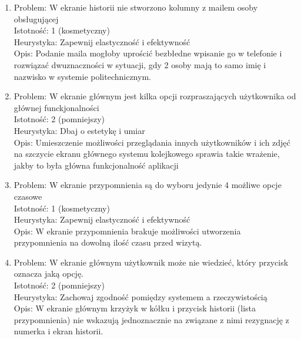 \documentclass[12pt]{article}
\begin{document}
\begin {enumerate}
\item Problem: W ekranie historii nie stworzono kolumny z mailem osoby obsługującej\\
Istotność: 1 (kosmetyczny)\\
Heurystyka: Zapewnij elastyczność i efektywność\\
Opis: Podanie maila mogłoby uprościć bezbłedne wpisanie go w telefonie i rozwiązać dwuznaczności w sytuacji, gdy 2 osoby mają to samo imię i nazwisko w systemie politechnicznym.

\item Problem: W ekranie głównym jest kilka opcji rozpraszających użytkownika od głównej funckjonalności\\
Istotność: 2 (pomniejszy)\\
Heurystyka: Dbaj o estetykę i umiar\\
Opis: Umieszczenie możliwości przeglądania innych użytkowników i ich zdjęć na szczycie ekranu głównego systemu kolejkowego sprawia takie wrażenie, jakby to była główna funkcjonalność aplikacji

\item Problem: W ekranie przypomnienia są do wyboru jedynie 4 możliwe opcje czasowe\\
Istotność: 1 (kosmetyczny)\\
Heurystyka: Zapewnij elastyczność i efektywność\\
Opis: W ekranie przypomnienia brakuje możliwości utworzenia przypomnienia na dowolną ilość czasu przed wizytą.

\item Problem: W ekranie głównym użytkownik może nie wiedzieć, który przycisk oznacza jaką opcję. \\
Istotność: 2 (pomniejszy)\\
Heurystyka: Zachowaj zgodność pomiędzy systemem a rzeczywistością\\
Opis: W ekranie głównym krzyżyk w kółku i przycisk historii (lista przypomnienia) nie wskazują jednoznacznie na związane z nimi rezygnację z numerka i ekran historii.


\end{enumerate}
\end{document}
